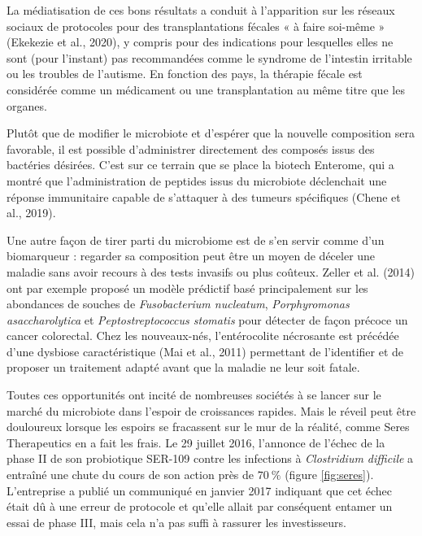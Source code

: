 \documentclass[12pt,a4paper]{reedthesis}
\theoremstyle{definition}
\theoremstyle{definition}
\theoremstyle{definition}
\theoremstyle{remark}
\begin{document}
La médiatisation de ces bons résultats a conduit à l'apparition sur les réseaux sociaux de protocoles pour des transplantations fécales « à faire soi-même » (Ekekezie et al., 2020), y compris pour des indications pour lesquelles elles ne sont (pour l'instant) pas recommandées comme le syndrome de l'intestin irritable ou les troubles de l'autisme. En fonction des pays, la thérapie fécale est considérée comme un médicament ou une transplantation au même titre que les organes.

Plutôt que de modifier le microbiote et d'espérer que la nouvelle composition sera favorable, il est possible d'administrer directement des composés issus des bactéries désirées. C'est sur ce terrain que se place la biotech Enterome, qui a montré que l'administration de peptides issus du microbiote déclenchait une réponse immunitaire capable de s'attaquer à des tumeurs spécifiques (Chene et al., 2019).

Une autre façon de tirer parti du microbiome est de s'en servir comme d'un biomarqueur : regarder sa composition peut être un moyen de déceler une maladie sans avoir recours à des tests invasifs ou plus coûteux.
Zeller et al. (2014) ont par exemple proposé un modèle prédictif basé principalement sur les abondances de souches de \emph{Fusobacterium nucleatum}, \emph{Porphyromonas asaccharolytica} et \emph{Peptostreptococcus stomatis} pour détecter de façon précoce un cancer colorectal.
Chez les nouveaux-nés, l'entérocolite nécrosante est précédée d'une dysbiose caractéristique (Mai et al., 2011) permettant de l'identifier et de proposer un traitement adapté avant que la maladie ne leur soit fatale.

Toutes ces opportunités ont incité de nombreuses sociétés à se lancer sur le marché du microbiote dans l'espoir de croissances rapides. Mais le réveil peut être douloureux lorsque les espoirs se fracassent sur le mur de la réalité, comme Seres Therapeutics en a fait les frais. Le 29 juillet 2016, l'annonce de l'échec de la phase II de son probiotique SER-109 contre les infections à \emph{Clostridium difficile} a entraîné une chute du cours de son action près de \(70~\%\) (figure \ref{fig:seres}). L'entreprise a publié un communiqué en janvier 2017 indiquant que cet échec était dû à une erreur de protocole et qu'elle allait par conséquent entamer un essai de phase III, mais cela n'a pas suffi à rassurer les investisseurs.
\end{document}
